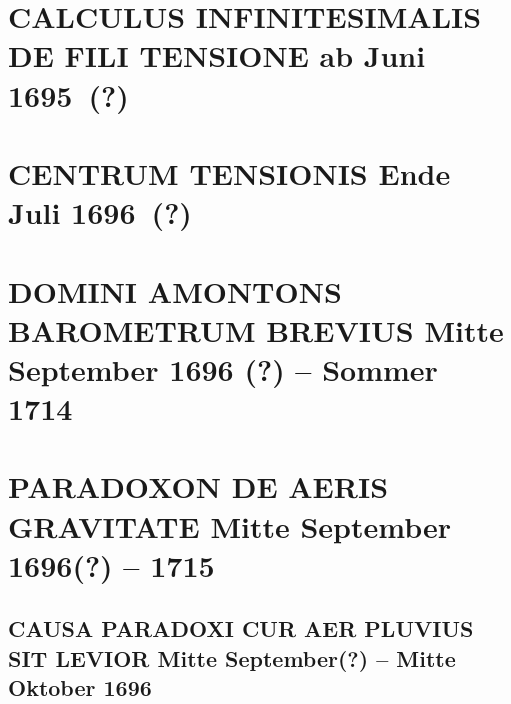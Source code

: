 \documentclass[%
fontsize=10pt,
]{scrbook}
\DeclareRobustCommand{\bracks}[1]{%
\textup{\lbrack}#1\textup{\rbrack}}
\begin{document}
\chapter[tocentry={Calculus infinitesimalis de fili tensione %
\enskip\bracks{ab Juni 1695~(?)}}, %
head={Calculus infinitesimalis de fili tensione%
}]%
{\MakeUppercase{Calculus infinitesimalis de fili tensione} %
\newline\bracks{ab Juni 1695~(?)}} %
\label{57578}




\chapter[tocentry={Centrum tensionis %
\enskip\bracks{Ende Juli 1696~(?)}%
}, %
head={Centrum tensionis%
}]%
{\MakeUppercase{Centrum tensionis} %
\newline\bracks{Ende Juli 1696~(?)}%
} %
\label{60337}




\chapter[tocentry={Domini Amontons barometrum brevius
\enskip\bracks{%
Mitte September 1696
(?)
-- Sommer 1714%
}}, %
head={Domini Amontons barometrum brevius}]%
{\MakeUppercase{Domini Amontons barometrum brevius}
\newline\bracks{%
Mitte September 1696
(?)
-- Sommer 1714%
}} %
\label{53451}




\chapter[tocentry={Paradoxon de aeris gravitate%
\enskip%
\bracks{%
Mitte September 1696\;(?)
-- 1715}},
head={Paradoxon de aeris gravitate %
}]%
{\MakeUppercase{Paradoxon de aeris gravitate %
}
\newline%
\bracks{%
Mitte September 1696\;(?)
-- 1715}}
\label{paradoxon_intro}



\section[tocentry={Causa paradoxi cur aer pluvius sit levior
\enskip%
\bracks{%
Mitte September\;(?) -- Mitte Oktober 1696%
}},
head={Causa paradoxi cur aer pluvius sit levior}]%
{\MakeUppercase{Causa paradoxi cur aer pluvius sit levior}
\newline%
\bracks{%
Mitte September\;(?) -- Mitte Oktober 1696%
}}
\label{53442}

\end{document}
